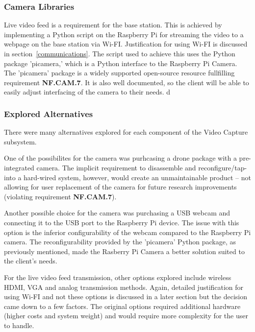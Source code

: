 \subsubsection{Camera Libraries}
Live video feed is a requirement for the base station. This is achieved by implementing a Python script on the Raspberry Pi for streaming the video to a webpage on the base station via Wi-FI. Justification for using Wi-FI is discussed in section~\ref{communications}. The script used to achieve this uses the Python package 'picamera,' which is a Python interface to the Raspberry Pi Camera. The 'picamera' package is a widely supported open-source resource fullfilling requirement \textbf{NF.CAM.7}. It is also well documented, so the client will be able to easily adjust interfacing of the camera to their needs. d

\subsubsection{Explored Alternatives}
There were many alternatives explored for each component of the Video Capture subsystem.

One of the possibilites for the camera was purhcasing a drone package with a pre-integrated camera. The implicit requirement to disassemble and reconfigure/tap-into a hard-wired system, however, would create an unmaintainable product -- not allowing for user replacement of the camera for future research improvements (violating requirement \textbf{NF.CAM.7}). %

Another possible choice for the camera was purchasing a USB webcam and connecting it to the USB port to the Raspberry Pi device. The issue with this option is the inferior configurability of the webcam compared to the Raspberry Pi camera. The reconfigurability provided by the 'picamera' Python package, as previously mentioned, made the Rasberry Pi Camera a better solution suited to the client's needs.

For the live video feed transmission, other options explored include wireless HDMI, VGA and analog transmission methods. Again, detailed justification for using Wi-FI and not these options is discussed in a later section but the decision came down to a few factors. The original options required additional hardware (higher costs and system weight) and would require more complexity for the user to handle.
